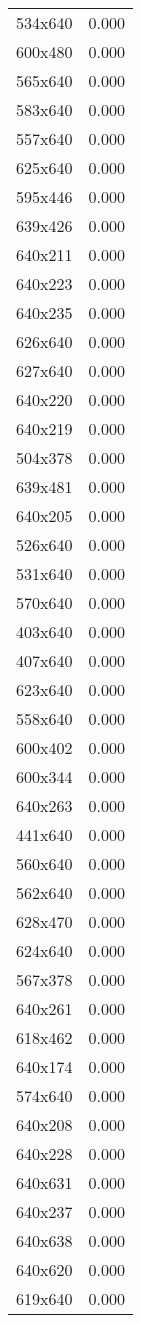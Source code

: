 \begin{table}
\begin{tabular}{lr}
534x640 & 0.000 \\
600x480 & 0.000 \\
565x640 & 0.000 \\
583x640 & 0.000 \\
557x640 & 0.000 \\
625x640 & 0.000 \\
595x446 & 0.000 \\
639x426 & 0.000 \\
640x211 & 0.000 \\
640x223 & 0.000 \\
640x235 & 0.000 \\
626x640 & 0.000 \\
627x640 & 0.000 \\
640x220 & 0.000 \\
640x219 & 0.000 \\
504x378 & 0.000 \\
639x481 & 0.000 \\
640x205 & 0.000 \\
526x640 & 0.000 \\
531x640 & 0.000 \\
570x640 & 0.000 \\
403x640 & 0.000 \\
407x640 & 0.000 \\
623x640 & 0.000 \\
558x640 & 0.000 \\
600x402 & 0.000 \\
600x344 & 0.000 \\
640x263 & 0.000 \\
441x640 & 0.000 \\
560x640 & 0.000 \\
562x640 & 0.000 \\
628x470 & 0.000 \\
624x640 & 0.000 \\
567x378 & 0.000 \\
640x261 & 0.000 \\
618x462 & 0.000 \\
640x174 & 0.000 \\
574x640 & 0.000 \\
640x208 & 0.000 \\
640x228 & 0.000 \\
640x631 & 0.000 \\
640x237 & 0.000 \\
640x638 & 0.000 \\
640x620 & 0.000 \\
619x640 & 0.000 \\

\end{tabular}
\end{table}
